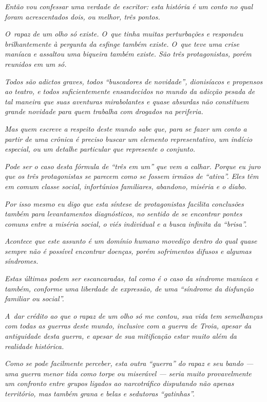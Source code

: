 \emph{Então vou confessar uma verdade de escritor: esta história é um
conto no qual foram acrescentados dois, ou melhor, três pontos.}~

\emph{O~rapaz de um olho só existe. O~que tinha muitas perturbações e
respondeu brilhantemente à pergunta da esfinge também existe. O~que teve
uma crise maníaca e assaltou uma biqueira também existe. São três
protagonistas, porém reunidos em um só.}~

\emph{Todos são adictos graves, todos ``buscadores de novidade'',
dionisíacos e propensos ao teatro, e todos suficientemente ensandecidos
no mundo da adicção pesada de tal maneira que suas aventuras
mirabolantes e quase absurdas não constituem grande novidade para quem
trabalha com drogados na periferia.}~

\emph{Mas quem escreve a respeito deste mundo sabe que, para se fazer um
conto a partir de uma crônica é preciso buscar um elemento
representativo, um indício especial, ou um detalhe particular que
represente o conjunto.}~

\emph{Pode ser o caso desta fórmula de ``três em um'' que vem a calhar.
Porque eu juro que os três protagonistas se parecem como se fossem
irmãos de ``ativa''. Eles têm em comum classe social, infortúnios
familiares, abandono, miséria e o diabo.}~

\emph{Por isso mesmo eu digo que esta síntese de protagonistas facilita
conclusões também para levantamentos diagnósticos, no sentido de se
encontrar pontes comuns entre a miséria social, o viés individual e a
busca infinita da ``brisa''.}~

\emph{Acontece que este assunto é um domínio humano movediço dentro do
qual quase sempre não é possível encontrar doenças, porém sofrimentos
difusos e algumas síndromes.}~

\emph{Estas últimas podem ser escancaradas, tal como é o caso da
síndrome maníaca e também, conforme uma liberdade de expressão, de uma
``síndrome da disfunção familiar ou social''.}~

\emph{A~dar crédito ao que o rapaz de um olho só me contou, sua vida tem
semelhanças com todas as guerras deste mundo, inclusive com a guerra de
Troia, apesar da antiguidade desta guerra, e apesar de sua mitificação
estar muito além da realidade histórica.}~

\emph{Como se pode facilmente perceber, esta outra ``guerra'' do rapaz e
seu bando --- uma guerra menor tida como torpe ou miserável --- seria
muito provavelmente um confronto entre grupos ligados ao narcotráfico
disputando não apenas território, mas também grana e belas e sedutoras
``gatinhas''.}~

